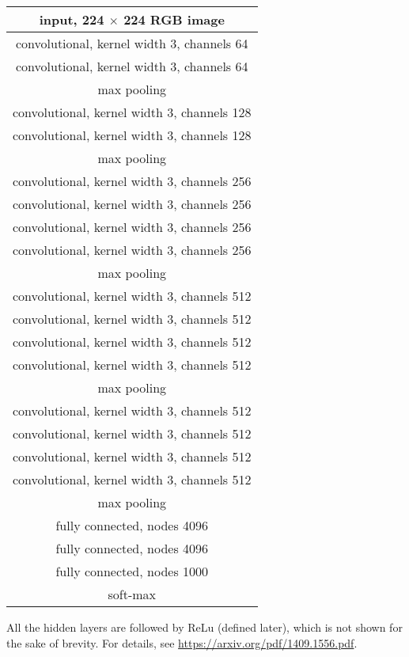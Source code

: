 \documentclass[]{article}
\begin{document}
\begin{center}
\begin{tabular}{|c|}
  \hline
  input, 224 $\times$ 224 RGB image\\
  \hline
  convolutional, kernel width 3, channels 64\\
  \hline
  convolutional, kernel width 3, channels 64\\
  \hline
  max pooling\\
  \hline
  convolutional, kernel width 3, channels 128\\
  \hline
  convolutional, kernel width 3, channels 128\\
  \hline
  max pooling\\
  \hline
  convolutional, kernel width 3, channels 256\\
  \hline
  convolutional, kernel width 3, channels 256\\
  \hline
  convolutional, kernel width 3, channels 256\\
  \hline
  convolutional, kernel width 3, channels 256\\
  \hline
  max pooling\\
  \hline
  convolutional, kernel width 3, channels 512\\
  \hline
  convolutional, kernel width 3, channels 512\\
  \hline
  convolutional, kernel width 3, channels 512\\
  \hline
  convolutional, kernel width 3, channels 512\\
  \hline
  max pooling\\
  \hline
  convolutional, kernel width 3, channels 512\\
  \hline
  convolutional, kernel width 3, channels 512\\
  \hline
  convolutional, kernel width 3, channels 512\\
  \hline
  convolutional, kernel width 3, channels 512\\
  \hline
  max pooling\\
  \hline
  fully connected, nodes 4096\\
  \hline
  fully connected, nodes 4096\\
  \hline
  fully connected, nodes 1000\\
  \hline
  soft-max\\
  \hline
\end{tabular}
\end{center}
All the hidden layers are followed by ReLu (defined later),
which is not shown for the sake of brevity. For details, see
\url{https://arxiv.org/pdf/1409.1556.pdf}.
\end{document}
